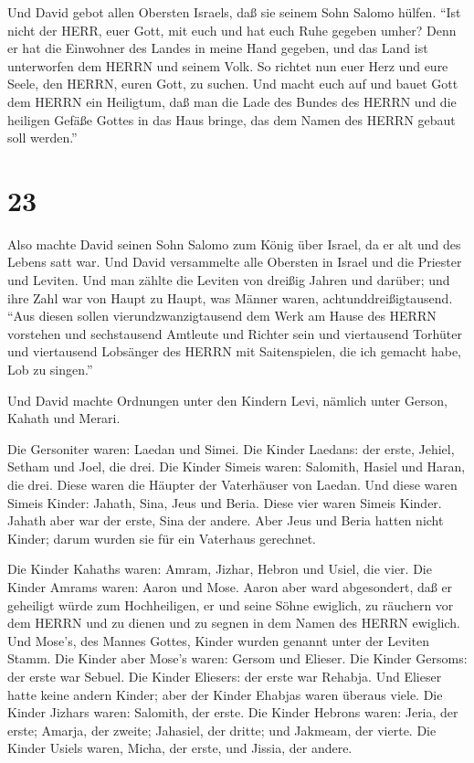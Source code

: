  Und David gebot allen Obersten Israels, daß sie seinem
Sohn Salomo hülfen.  ``Ist nicht der HERR, euer Gott, mit
euch und hat euch Ruhe gegeben umher? Denn er hat die Einwohner des
Landes in meine Hand gegeben, und das Land ist unterworfen dem HERRN und
seinem Volk.  So richtet nun euer Herz und eure Seele, den
HERRN, euren Gott, zu suchen. Und macht euch auf und bauet Gott dem
HERRN ein Heiligtum, daß man die Lade des Bundes des HERRN und die
heiligen Gefäße Gottes in das Haus bringe, das dem Namen des HERRN
gebaut soll werden.''

\hypertarget{section-22}{%
\section{23}\label{section-22}}

 Also machte David seinen Sohn Salomo zum König über Israel,
da er alt und des Lebens satt war.  Und David versammelte
alle Obersten in Israel und die Priester und Leviten.  Und
man zählte die Leviten von dreißig Jahren und darüber; und ihre Zahl war
von Haupt zu Haupt, was Männer waren, achtunddreißigtausend.
 ``Aus diesen sollen vierundzwanzigtausend dem Werk am Hause
des HERRN vorstehen und sechstausend Amtleute und Richter sein
 und viertausend Torhüter und viertausend Lobsänger des
HERRN mit Saitenspielen, die ich gemacht habe, Lob zu singen.''

 Und David machte Ordnungen unter den Kindern Levi, nämlich
unter Gerson, Kahath und Merari.

 Die Gersoniter waren: Laedan und Simei.  Die
Kinder Laedans: der erste, Jehiel, Setham und Joel, die drei.
 Die Kinder Simeis waren: Salomith, Hasiel und Haran, die
drei. Diese waren die Häupter der Vaterhäuser von Laedan. 
Und diese waren Simeis Kinder: Jahath, Sina, Jeus und Beria. Diese vier
waren Simeis Kinder.  Jahath aber war der erste, Sina der
andere. Aber Jeus und Beria hatten nicht Kinder; darum wurden sie für
ein Vaterhaus gerechnet.

 Die Kinder Kahaths waren: Amram, Jizhar, Hebron und Usiel,
die vier.  Die Kinder Amrams waren: Aaron und Mose. Aaron
aber ward abgesondert, daß er geheiligt würde zum Hochheiligen, er und
seine Söhne ewiglich, zu räuchern vor dem HERRN und zu dienen und zu
segnen in dem Namen des HERRN ewiglich.  Und Mose's, des
Mannes Gottes, Kinder wurden genannt unter der Leviten Stamm.
 Die Kinder aber Mose's waren: Gersom und Elieser.
 Die Kinder Gersoms: der erste war Sebuel. 
Die Kinder Eliesers: der erste war Rehabja. Und Elieser hatte keine
andern Kinder; aber der Kinder Ehabjas waren überaus viele.
 Die Kinder Jizhars waren: Salomith, der erste.
 Die Kinder Hebrons waren: Jeria, der erste; Amarja, der
zweite; Jahasiel, der dritte; und Jakmeam, der vierte.  Die
Kinder Usiels waren, Micha, der erste, und Jissia, der andere.

